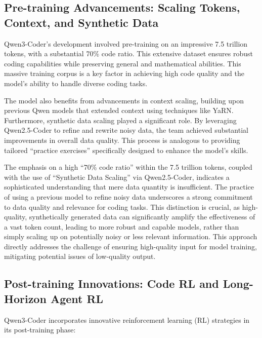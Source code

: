 \subsection{Pre-training Advancements: Scaling Tokens, Context, and Synthetic Data}

Qwen3-Coder's development involved pre-training on an impressive 7.5 trillion tokens, with a substantial 70\% code ratio. This extensive dataset ensures robust coding capabilities while preserving general and mathematical abilities.\cite{qwenlm_qwen3coder_blog_2025, gupta_qwen3coder_medium_2025} This massive training corpus is a key factor in achieving high code quality and the model's ability to handle diverse coding tasks.\cite{gupta_qwen3coder_medium_2025}

The model also benefits from advancements in context scaling, building upon previous Qwen models that extended context using techniques like YaRN.\cite{gupta_qwen3coder_medium_2025, qwen2_5_1m_techreport_2025, github_qwenlm_qwencode_2025} Furthermore, synthetic data scaling played a significant role. By leveraging Qwen2.5-Coder to refine and rewrite noisy data, the team achieved substantial improvements in overall data quality. This process is analogous to providing tailored ``practice exercises'' specifically designed to enhance the model's skills.\cite{gupta_qwen3coder_medium_2025, willison_qwen3coder_2025}

The emphasis on a high ``70\% code ratio'' within the 7.5 trillion tokens, coupled with the use of ``Synthetic Data Scaling'' via Qwen2.5-Coder, indicates a sophisticated understanding that mere data quantity is insufficient. The practice of using a previous model to refine noisy data underscores a strong commitment to data quality and relevance for coding tasks. This distinction is crucial, as high-quality, synthetically generated data can significantly amplify the effectiveness of a vast token count, leading to more robust and capable models, rather than simply scaling up on potentially noisy or less relevant information. This approach directly addresses the challenge of ensuring high-quality input for model training, mitigating potential issues of low-quality output.

\subsection{Post-training Innovations: Code RL and Long-Horizon Agent RL}

Qwen3-Coder incorporates innovative reinforcement learning (RL) strategies in its post-training phase:

